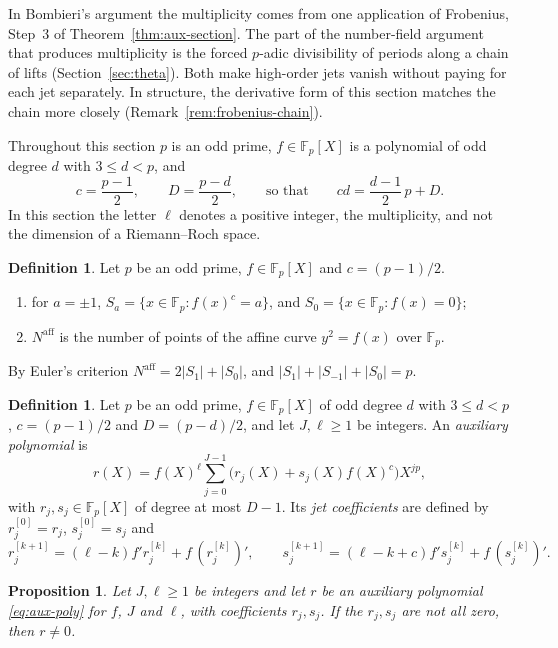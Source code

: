 \documentclass[11pt]{amsbook}
\theoremstyle{plain}
\newtheorem{proposition}[theorem]{Proposition}
\theoremstyle{definition}
\newtheorem{definition}[theorem]{Definition}
\theoremstyle{remark}
\numberwithin{equation}{section}
\numberwithin{figure}{chapter}
\numberwithin{table}{chapter}
\newcommand{\F}{\mathbb{F}}
\begin{document}
In Bombieri's argument the multiplicity comes from one application
of Frobenius, Step~3 of Theorem~\ref{thm:aux-section}. The part of
the number-field argument that produces multiplicity is the forced
$p$-adic divisibility of periods along a chain of lifts
(Section~\ref{sec:theta}). Both make high-order jets vanish without
paying for each jet separately. In structure, the derivative form
of this section matches the chain more closely
(Remark~\ref{rem:frobenius-chain}).

Throughout this section $p$ is an odd prime, $f\in\F_p[X]$ is a
polynomial of odd degree $d$ with $3\le d<p$, and
\[
c=\frac{p-1}2,\qquad D=\frac{p-d}2,
\qquad\text{so that}\qquad cd=\frac{d-1}2\,p+D.
\]
In this section the letter $\ell$ denotes a positive integer, the
multiplicity, and not the dimension of a Riemann--Roch space.

\begin{definition}\label{def:Sa}
Let $p$ be an odd prime, $f\in\F_p[X]$ and $c=(p-1)/2$.
\begin{enumerate}
\item for $a=\pm1$, $S_a=\{x\in\F_p:f(x)^c=a\}$, and
$S_0=\{x\in\F_p:f(x)=0\}$;
\item $N^{\mathrm{aff}}$ is the number of points of the affine
curve $y^2=f(x)$ over $\F_p$.
\end{enumerate}
\end{definition}

By Euler's criterion
$N^{\mathrm{aff}}=2\lvert S_1\rvert+\lvert S_0\rvert$, and
$\lvert S_1\rvert+\lvert S_{-1}\rvert+\lvert S_0\rvert=p$.

\begin{definition}\label{def:aux-poly}
Let $p$ be an odd prime, $f\in\F_p[X]$ of odd degree $d$ with
$3\le d<p$, $c=(p-1)/2$ and $D=(p-d)/2$, and let $J,\ell\ge1$ be
integers. An \emph{auxiliary polynomial} is
\begin{equation}\label{eq:aux-poly}
r(X)=f(X)^\ell\sum_{j=0}^{J-1}
\bigl(r_j(X)+s_j(X)f(X)^c\bigr)X^{jp},
\end{equation}
with $r_j,s_j\in\F_p[X]$ of degree at most $D-1$. Its \emph{jet
coefficients} are defined by $r_j^{[0]}=r_j$, $s_j^{[0]}=s_j$ and
\[
r_j^{[k+1]}=(\ell-k)f'r_j^{[k]}+f\,(r_j^{[k]})',\qquad
s_j^{[k+1]}=(\ell-k+c)f's_j^{[k]}+f\,(s_j^{[k]})'.
\]
\end{definition}

\begin{proposition}\label{prop:J-nonvanishing}
Let $J,\ell\ge1$ be integers and let $r$ be an auxiliary polynomial
\eqref{eq:aux-poly} for $f$, $J$ and $\ell$, with coefficients
$r_j,s_j$. If the $r_j,s_j$ are not all zero, then $r\ne0$.
\end{proposition}
\end{document}
